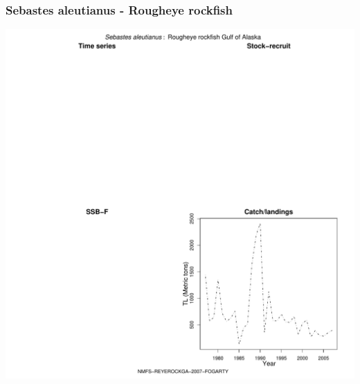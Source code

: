 \subsubsection{Sebastes aleutianus - Rougheye rockfish}
\begin{center}
\includegraphics[width=1.2\textwidth]{../R/figures/NMFS-REYEROCKGA-2007-FOGARTY.pdf}
\end{center}

